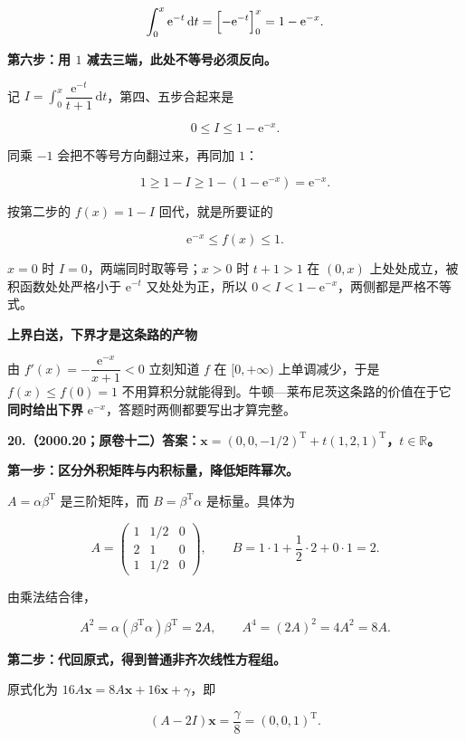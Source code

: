 \documentclass[UTF8,11pt,fontset=windows]{ctexart}
\begin{document}
$$
\int_0^x\mathrm e^{-t}\,\mathrm dt=\Bigl[-\mathrm e^{-t}\Bigr]_0^x
=1-\mathrm e^{-x}.
$$

\textbf{第六步：用 $1$ 减去三端，此处不等号必须反向。}

记 $I=\int_0^x\dfrac{\mathrm e^{-t}}{t+1}\,\mathrm dt$，第四、五步合起来是

$$
0\le I\le1-\mathrm e^{-x}.
$$

同乘 $-1$ 会把不等号方向翻过来，再同加 $1$：

$$
1\ge1-I\ge1-(1-\mathrm e^{-x})=\mathrm e^{-x}.
$$

按第二步的 $f(x)=1-I$ 回代，就是所要证的

$$
\boxed{\,\mathrm e^{-x}\le f(x)\le1.\,}
$$

$x=0$ 时 $I=0$，两端同时取等号；$x>0$ 时 $t+1>1$ 在 $(0,x)$ 上处处成立，被积函数处处严格小于 $\mathrm e^{-t}$ 又处处为正，所以 $0<I<1-\mathrm e^{-x}$，两侧都是严格不等式。

{\bfseries 上界白送，下界才是这条路的产物\par}
由 $f'(x)=-\dfrac{\mathrm e^{-x}}{x+1}<0$ 立刻知道 $f$ 在 $[0,+\infty)$ 上单调减少，于是 $f(x)\le f(0)=1$ 不用算积分就能得到。牛顿—莱布尼茨这条路的价值在于它\textbf{同时给出下界} $\mathrm e^{-x}$，答题时两侧都要写出才算完整。

\clearpage

\textbf{20.（2000.20；原卷十二）答案：$\boldsymbol x=(0,0,-1/2)^{\mathrm T}+t(1,2,1)^{\mathrm T}$，$t\in\mathbb R$。}

\textbf{第一步：区分外积矩阵与内积标量，降低矩阵幂次。}

$A=\alpha\beta^{\mathrm T}$ 是三阶矩阵，而 $B=\beta^{\mathrm T}\alpha$ 是标量。具体为

$$
A=\begin{pmatrix}1&1/2&0\\2&1&0\\1&1/2&0\end{pmatrix},
\qquad B=1\cdot1+\frac12\cdot2+0\cdot1=2.
$$

由乘法结合律，

$$
A^2=\alpha(\beta^{\mathrm T}\alpha)\beta^{\mathrm T}=2A,
\qquad A^4=(2A)^2=4A^2=8A.
$$

\textbf{第二步：代回原式，得到普通非齐次线性方程组。}

原式化为 $16A\boldsymbol x=8A\boldsymbol x+16\boldsymbol x+\gamma$，即

$$
(A-2I)\boldsymbol x=\frac\gamma8=(0,0,1)^{\mathrm T}.
$$
\end{document}
